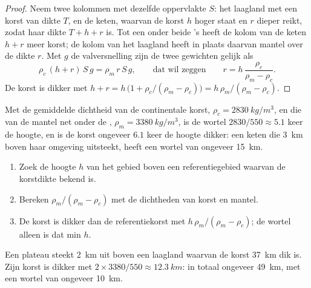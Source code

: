 \begin{proof}
Neem twee kolommen met dezelfde oppervlakte $S$: het laagland met een korst van
dikte $T$, en de keten, waarvan de korst $h$ hoger staat en $r$ dieper reikt,
zodat haar dikte $T + h + r$ is. Tot een  onder beide 's
heeft de kolom van de keten $h + r$ meer korst; de kolom van het laagland heeft
in plaats daarvan mantel over de dikte $r$. Met $g$ de valversnelling zijn de twee
gewichten gelijk als
\[
  \rho_c\,(h + r)\,S\,g = \rho_m\,r\,S\,g,
  \qquad\text{dat wil zeggen}\qquad
  r = h\,\frac{\rho_c}{\rho_m - \rho_c}.
\]
De korst is dikker met $h + r = h\,\bigl(1 + \rho_c/(\rho_m - \rho_c)\bigr)
= h\,\rho_m/(\rho_m - \rho_c)$.
\end{proof}

Met de gemiddelde dichtheid van de continentale korst, $\rho_c =
\qty{2830}{kg/m^3}$, en die van de mantel net onder de , $\rho_m =
\qty{3380}{kg/m^3}$, is de wortel $2830/550 \approx 5.1$ keer de hoogte,
en is de korst ongeveer $6.1$ keer de hoogte dikker: een keten die
\qty{3}{km} boven haar omgeving uitsteekt, heeft een wortel van ongeveer \qty{15}{km}.

\begin{method}\label{met:g11:lithosphere-asthenosphere:root}
\begin{enumerate}
  \item Zoek de hoogte $h$ van het gebied boven een referentiegebied waarvan de
        korstdikte bekend is.
  \item Bereken $\rho_m/(\rho_m - \rho_c)$ met de dichtheden van korst en
        mantel.
  \item De korst is dikker dan de referentiekorst met $h\,\rho_m/(\rho_m -
        \rho_c)$; de wortel alleen is dat min $h$.
\end{enumerate}
\end{method}

\begin{example}\label{ex:g11:lithosphere-asthenosphere:plateau}
Een plateau steekt \qty{2}{km} uit boven een laagland waarvan de korst \qty{37}{km}
dik is. Zijn korst is dikker met $2 \times 3380/550 \approx \qty{12.3}{km}$:
in totaal ongeveer \qty{49}{km}, met een wortel van ongeveer \qty{10}{km}.
\end{example}

